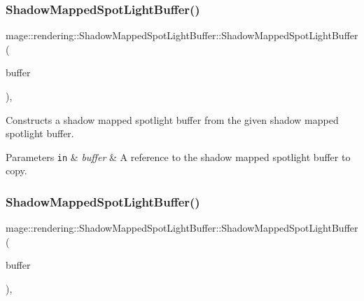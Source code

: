 \subsubsection{\texorpdfstring{Shadow\+Mapped\+Spot\+Light\+Buffer()}{ShadowMappedSpotLightBuffer()}\hspace{0.1cm}{\footnotesize\ttfamily [2/3]}}
{\footnotesize\ttfamily mage\+::rendering\+::\+Shadow\+Mapped\+Spot\+Light\+Buffer\+::\+Shadow\+Mapped\+Spot\+Light\+Buffer (\begin{DoxyParamCaption}\item[{const \mbox{\hyperlink{structmage_1_1rendering_1_1_shadow_mapped_spot_light_buffer}{Shadow\+Mapped\+Spot\+Light\+Buffer}} \&}]{buffer }\end{DoxyParamCaption})\hspace{0.3cm}{\ttfamily [default]}, {\ttfamily [noexcept]}}

Constructs a shadow mapped spotlight buffer from the given shadow mapped spotlight buffer.


\begin{DoxyParams}[1]{Parameters}
\mbox{\tt in}  & {\em buffer} & A reference to the shadow mapped spotlight buffer to copy. \\
\hline
\end{DoxyParams}
\mbox{\label{structmage_1_1rendering_1_1_shadow_mapped_spot_light_buffer_a9042ab916ee834f5519b5930de286ea4}} 
\subsubsection{\texorpdfstring{Shadow\+Mapped\+Spot\+Light\+Buffer()}{ShadowMappedSpotLightBuffer()}\hspace{0.1cm}{\footnotesize\ttfamily [3/3]}}
{\footnotesize\ttfamily mage\+::rendering\+::\+Shadow\+Mapped\+Spot\+Light\+Buffer\+::\+Shadow\+Mapped\+Spot\+Light\+Buffer (\begin{DoxyParamCaption}\item[{\mbox{\hyperlink{structmage_1_1rendering_1_1_shadow_mapped_spot_light_buffer}{Shadow\+Mapped\+Spot\+Light\+Buffer}} \&\&}]{buffer }\end{DoxyParamCaption})\hspace{0.3cm}{\ttfamily [default]}, {\ttfamily [noexcept]}}

